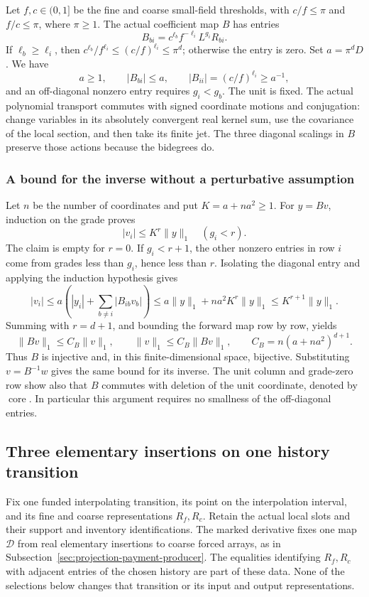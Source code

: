 Let $f,c\in(0,1]$ be the fine and coarse small-field thresholds,
with $c/f\le\pi$ and $f/c\le\pi$, where $\pi\ge1$. The actual
coefficient map $B$ has entries
\[
                      B_{bi}=c^{\ell_b}f^{-\ell_i}L^{g_i}R_{bi}.
\]
If $\ell_b\ge\ell_i$, then
$c^{\ell_b}/f^{\ell_i}\le(c/f)^{\ell_i}\le\pi^d$; otherwise
the entry is zero. Set $a=\pi^dD$. We have
\[
 a\ge1,\qquad |B_{bi}|\le a,\qquad
 |B_{ii}|=(c/f)^{\ell_i}\ge a^{-1},
\]
and an off-diagonal nonzero entry requires $g_i<g_b$.
The unit is fixed. The actual polynomial transport commutes with
signed coordinate motions and conjugation: change variables in its
absolutely convergent real kernel sum, use the covariance of the
local section, and then take its finite jet. The three diagonal
scalings in $B$ preserve those actions because the bidegrees do.

\subsubsection{A bound for the inverse without a perturbative assumption}
Let $n$ be the number of coordinates and put $K=a+na^2\ge1$.
For $y=Bv$, induction on the grade proves
\[
                |v_i|\le K^r\|y\|_1\quad(g_i<r).
\]
The claim is empty for $r=0$. If $g_i<r+1$, the other nonzero
entries in row $i$ come from grades less than $g_i$, hence less
than $r$. Isolating the diagonal entry and applying the induction
hypothesis gives
\[
 |v_i|\le a\left(|y_i|+\sum_{b\ne i}|B_{ib}v_b|\right)
 \le a\|y\|_1+na^2K^r\|y\|_1
 \le K^{r+1}\|y\|_1.
\]
Summing with $r=d+1$, and bounding the forward map row by row, yields
\begin{equation}\label{eq:heading-both-prices}
 \|Bv\|_1\le C_B\|v\|_1,
 \qquad \|v\|_1\le C_B\|Bv\|_1,
 \qquad C_B=n(a+na^2)^{d+1}.
\end{equation}
Thus $B$ is injective and, in this finite-dimensional space,
bijective. Substituting $v=B^{-1}w$ gives the same bound for its
inverse. The unit column and grade-zero row show also that $B$
commutes with deletion of the unit coordinate, denoted by
$\operatorname{core}$. In particular this argument requires no
smallness of the off-diagonal entries.

\subsection{Three elementary insertions on one history transition}
\label{sec:three-port-history}
Fix one funded interpolating transition, its point on the interpolation
interval, and its fine and coarse representations $R_f,R_c$.
Retain the actual local slots and their support and inventory
identifications. The marked derivative fixes one map $\mathcal D$
from real elementary insertions to coarse forced arrays, as in
Subsection~\ref{sec:projection-payment-producer}. The equalities
identifying $R_f,R_c$ with adjacent entries of the chosen history
are part of these data. None of the selections below changes that
transition or its input and output representations.

